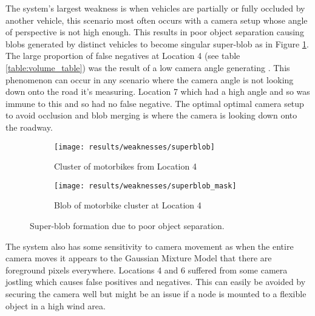 The system's largest weakness is when vehicles are partially or fully occluded by another vehicle, this scenario most often occurs with a camera setup whose angle of perspective is not high enough. This results in poor object separation causing blobs generated by distinct vehicles to become singular super-blob as in Figure \ref{fig:superblob}. The large proportion of false negatives at Location 4 (see table \ref{table:volume_table}) was the result of a low camera angle generating . This phenomenon can occur in any scenario where the camera angle is not looking down onto the road it's measuring. Location 7 which had a high angle and so was immune to this and so had no false negative. The optimal optimal camera setup to avoid occlusion and blob merging is where the camera is looking down onto the roadway.

\begin{figure}[H]
    \centering
     \begin{subfigure}[b]{0.45\textwidth}
        \texttt{[image: results/weaknesses/superblob]}
	\captionsetup{format = hang}
    \caption{Cluster of motorbikes from Location 4}
    \end{subfigure} 
    \begin{subfigure}[b]{0.45\textwidth}
        \texttt{[image: results/weaknesses/superblob\_mask]}	
	\captionsetup{format = hang}
    \caption{Blob of motorbike cluster at Location 4}
    \end{subfigure}
    \captionsetup{format = hang}
    \caption{Super-blob formation due to poor object separation.}
    \label{fig:superblob}
\end{figure}

The system also has some sensitivity to camera movement as when the entire camera moves it appears to the Gaussian Mixture Model that there are foreground pixels everywhere. Locations 4 and 6 suffered from some camera jostling which causes false positives and negatives. This can easily be avoided by securing the camera well but might be an issue if a node is mounted to a flexible object in a high wind area.

